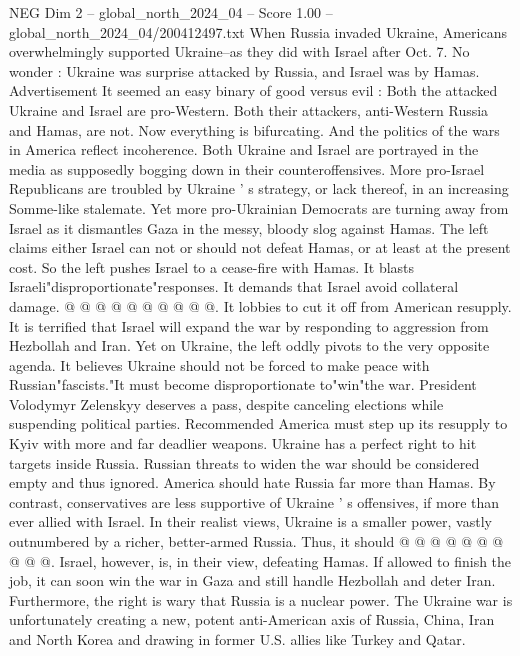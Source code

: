 \begin{textsample}{NEG Dim 2 – global\_north\_2024\_04 – Score 1.00 – global\_north\_2024\_04/200412497.txt}  \label{ex:f2_neg_181}
When Russia invaded Ukraine, Americans overwhelmingly supported Ukraine--as they did with Israel after Oct. 7.
No wonder : Ukraine was surprise attacked by Russia, and Israel was by Hamas.
Advertisement It seemed an easy binary of good versus evil : Both the attacked Ukraine and Israel are pro-Western.
Both their attackers, anti-Western Russia and Hamas, are not.
Now everything is bifurcating.
And the politics of the wars in America reflect incoherence.
Both Ukraine and Israel are portrayed in the media as supposedly bogging down in their counteroffensives.
More pro-Israel Republicans are troubled by Ukraine ' s strategy, or lack thereof, in an increasing Somme-like stalemate.
Yet more pro-Ukrainian Democrats are turning away from Israel as it dismantles Gaza in the messy, bloody slog against Hamas.
The left claims either Israel can not or should not defeat Hamas, or at least at the present cost.
So the left pushes Israel to a cease-fire with Hamas.
It blasts Israeli"disproportionate"responses.
It demands that Israel avoid collateral damage. @ @ @ @ @ @ @ @ @ @.
It lobbies to cut it off from American resupply.
It is terrified that Israel will expand the war by responding to aggression from Hezbollah and Iran.
Yet on Ukraine, the left oddly pivots to the very opposite agenda.
It believes Ukraine should not be forced to make peace with Russian"fascists."It must become disproportionate to"win"the war.
President Volodymyr Zelenskyy deserves a pass, despite canceling elections while suspending political parties.
Recommended America must step up its resupply to Kyiv with more and far deadlier weapons.
Ukraine has a perfect right to hit targets inside Russia.
Russian threats to widen the war should be considered empty and thus ignored.
America should hate Russia far more than Hamas.
By contrast, conservatives are less supportive of Ukraine ' s offensives, if more than ever allied with Israel.
In their realist views, Ukraine is a smaller power, vastly outnumbered by a richer, better-armed Russia.
Thus, it should @ @ @ @ @ @ @ @ @ @.
Israel, however, is, in their view, defeating Hamas.
If allowed to finish the job, it can soon win the war in Gaza and still handle Hezbollah and deter Iran.
Furthermore, the right is wary that Russia is a nuclear power.
The Ukraine war is unfortunately creating a new, potent anti-American axis of Russia, China, Iran and North Korea and drawing in former U.S. allies like Turkey and Qatar.

\end{textsample}
